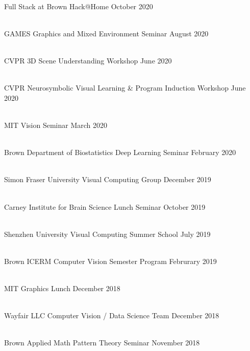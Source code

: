 \documentclass[line,margin]{res}
\begin{document}
\begin{resume}
\\
\talk
	{Full Stack at Brown}
	{Hack@Home}
	{October 2020}

\\
\talk
	{GAMES}
	{Graphics and Mixed Environment Seminar}
	{August 2020}

\\
\talk
	{CVPR}
	{3D Scene Understanding Workshop}
	{June 2020}

\\
\talk
	{CVPR}
	{Neurosymbolic Visual Learning \& Program Induction Workshop}
	{June 2020}

\\
\talk
	{MIT}
	{Vision Seminar}
	{March 2020}

\\
\talk
	{Brown Department of Biostatistics}
	{Deep Learning Seminar}
	{February 2020}

\\
\talk
	{Simon Fraser University}
	{Visual Computing Group}
	{December 2019}

\\
\talk
	{Carney Institute for Brain Science}
	{Lunch Seminar}
	{October 2019}

\\
\talk
	{Shenzhen University}
	{Visual Computing Summer School}
	{July 2019}

\\
\talk
	{Brown ICERM}
	{Computer Vision Semester Program}
	{Februrary 2019}

\\
\talk
	{MIT}
	{Graphics Lunch}
	{December 2018}

\\
\talk
	{Wayfair LLC}
	{Computer Vision / Data Science Team}
	{December 2018}

\\
\talk
	{Brown Applied Math}
	{Pattern Theory Seminar}
	{November 2018}


\end{resume}
\end{document}
